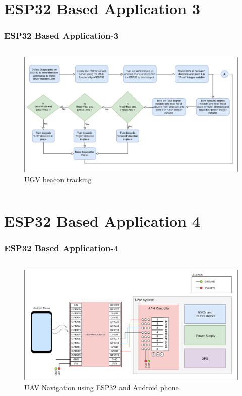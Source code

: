 \documentclass[xcolor=table]{beamer}
\begin{document}
\section{ESP32 Based Application 3}
\begin{frame}
\frametitle{ESP32 Based Application-3}
\begin{columns}
	\begin{figure}[h!]
  		\centering
  		\includegraphics[width=\linewidth]{./figs/Flow_UGV_beacon.png}
  		\caption{UGV beacon tracking}
  		\label{Flow_UGV_beacon}
	\end{figure}
\end{columns}
\end{frame}

\section{ESP32 Based Application 4}
\begin{frame}
\frametitle{ESP32 Based Application-4}
\begin{columns}
	\begin{figure}[h!]
  		\centering
  		\includegraphics[width=\linewidth]{./figs/Wiring_UAV_ESP32_commlink.png}
  		\caption{UAV Navigation using ESP32 and Android phone}
  		\label{Wiring_UAV_ESP32_commlink}
	\end{figure}
\end{columns}
\end{frame}
\end{document}
